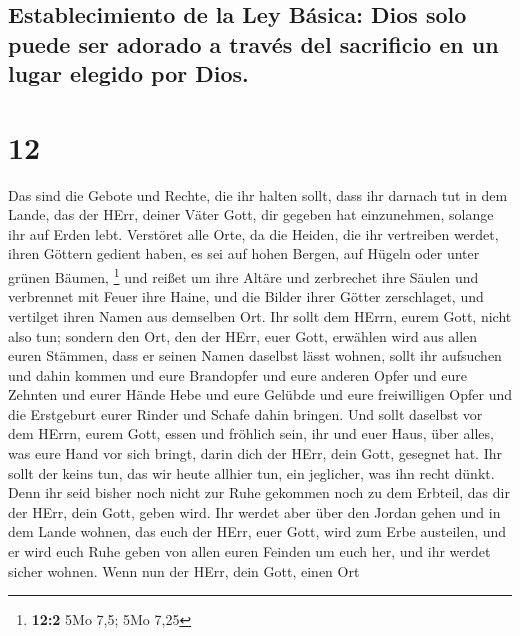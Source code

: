 \hypertarget{establecimiento-de-la-ley-buxe1sica-dios-solo-puede-ser-adorado-a-travuxe9s-del-sacrificio-en-un-lugar-elegido-por-dios.}{%
\subsection{Establecimiento de la Ley Básica: Dios solo puede ser
adorado a través del sacrificio en un lugar elegido por
Dios.}\label{establecimiento-de-la-ley-buxe1sica-dios-solo-puede-ser-adorado-a-travuxe9s-del-sacrificio-en-un-lugar-elegido-por-dios.}}

\hypertarget{section-11}{%
\section{12}\label{section-11}}

 Das sind die Gebote und Rechte, die ihr halten sollt,
dass ihr darnach tut in dem Lande, das der HErr, deiner Väter Gott, dir
gegeben hat einzunehmen, solange ihr auf Erden lebt. 
Verstöret alle Orte, da die Heiden, die ihr vertreiben werdet, ihren
Göttern gedient haben, es sei auf hohen Bergen, auf Hügeln oder unter
grünen Bäumen, \footnote{\textbf{12:2} 5Mo 7,5; 5Mo 7,25} 
und reißet um ihre Altäre und zerbrechet ihre Säulen und verbrennet mit
Feuer ihre Haine, und die Bilder ihrer Götter zerschlaget, und vertilget
ihren Namen aus demselben Ort.  Ihr sollt dem HErrn, eurem
Gott, nicht also tun;  sondern den Ort, den der HErr, euer
Gott, erwählen wird aus allen euren Stämmen, dass er seinen Namen
daselbst lässt wohnen, sollt ihr aufsuchen und dahin kommen
 und eure Brandopfer und eure anderen Opfer und eure
Zehnten und eurer Hände Hebe und eure Gelübde und eure freiwilligen
Opfer und die Erstgeburt eurer Rinder und Schafe dahin bringen.
 Und sollt daselbst vor dem HErrn, eurem Gott, essen und
fröhlich sein, ihr und euer Haus, über alles, was eure Hand vor sich
bringt, darin dich der HErr, dein Gott, gesegnet hat.  Ihr
sollt der keins tun, das wir heute allhier tun, ein jeglicher, was ihn
recht dünkt.  Denn ihr seid bisher noch nicht zur Ruhe
gekommen noch zu dem Erbteil, das dir der HErr, dein Gott, geben wird.
 Ihr werdet aber über den Jordan gehen und in dem Lande
wohnen, das euch der HErr, euer Gott, wird zum Erbe austeilen, und er
wird euch Ruhe geben von allen euren Feinden um euch her, und ihr werdet
sicher wohnen.  Wenn nun der HErr, dein Gott, einen Ort
